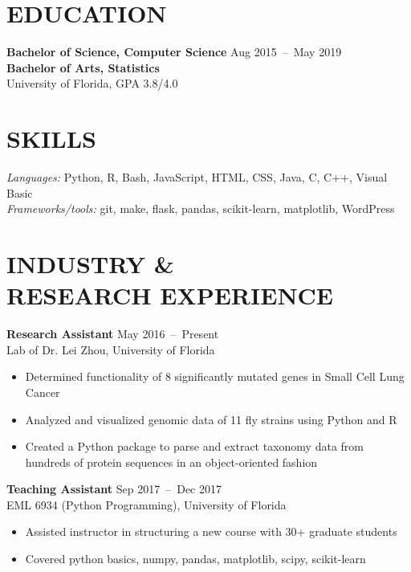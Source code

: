 \documentclass[line,resmargin]{res}
\begin{document}
\address{}
\address{}

\begin{resume}

\section{EDUCATION}
    \textbf{Bachelor of Science, Computer Science}    \hfill Aug 2015~--~May 2019 \\
    \textbf{Bachelor of Arts, Statistics} \\
    University of Florida, GPA 3.8/4.0

\section{SKILLS}
    {\sl Languages:} Python, R, Bash, JavaScript, HTML, CSS, Java, C, C++, Visual Basic \\
    {\sl Frameworks/tools:} git, make, flask, pandas, scikit-learn, matplotlib, WordPress

\section{INDUSTRY \& \\ RESEARCH EXPERIENCE}
    \textbf{Research Assistant}    \hfill May 2016~--~Present \\
    Lab of Dr. Lei Zhou, University of Florida
    \begin{itemize}  \itemsep -2pt
        \item Determined functionality of 8 significantly mutated genes in Small Cell Lung Cancer
        \item Analyzed and visualized genomic data of 11 fly strains using Python and R
        \item Created a Python package to parse and extract taxonomy data from hundreds of protein sequences in an object-oriented fashion
    \end{itemize}

    \textbf{Teaching Assistant}    \hfill Sep 2017~--~Dec 2017 \\
    EML 6934 (Python Programming), University of Florida
    \begin{itemize}  \itemsep -2pt
        \item Assisted instructor in structuring a new course with 30+ graduate students
        \item Covered python basics, numpy, pandas, matplotlib, scipy, scikit-learn
    \end{itemize}


\end{resume}
\end{document}
